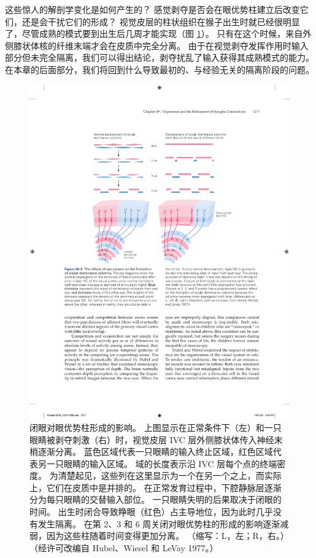 这些惊人的解剖学变化是如何产生的？ 感觉剥夺是否会在眼优势柱建立后改变它们，还是会干扰它们的形成？ 
视觉皮层的柱状组织在猴子出生时就已经很明显了，尽管成熟的模式要到出生后几周才能实现（图 \ref{fig:49_5}）。
只有在这个时候，来自外侧膝状体核的纤维末端才会在皮质中完全分离。 由于在视觉剥夺发挥作用时输入部分但未完全隔离，我们可以得出结论，剥夺扰乱了输入获得其成熟模式的能力。 在本章的后面部分，我们将回到什么导致最初的、与经验无关的隔离阶段的问题。

\begin{figure}[htbp]
	\centering
	\includegraphics[width=0.8\linewidth]{chap49/fig_49_5}
	\caption{闭眼对眼优势柱形成的影响。 上图显示在正常条件下（左）和一只眼睛被剥夺刺激（右）时，视觉皮层 IVC 层外侧膝状体传入神经末梢逐渐分离。 蓝色区域代表一只眼睛的输入终止区域，红色区域代表另一只眼睛的输入区域。 域的长度表示沿 IVC 层每个点的终端密度。 为清楚起见，这些列在这里显示为一个在另一个之上，而实际上，它们在皮质中是并排的。 在正常发育过程中，下腔静脉层逐渐分为每只眼睛的交替输入部位。 一只眼睛失明的后果取决于闭眼的时间。 出生时闭合导致睁眼（红色）占主导地位，因为此时几乎没有发生隔离。 在第 2、3 和 6 周关闭对眼优势柱的形成的影响逐渐减弱，因为这些柱随着时间变得更加分离。 （缩写：L，左；R，右。）（经许可改编自 Hubel、Wiesel 和 LeVay 1977。）}
	\label{fig:49_5}
\end{figure}

